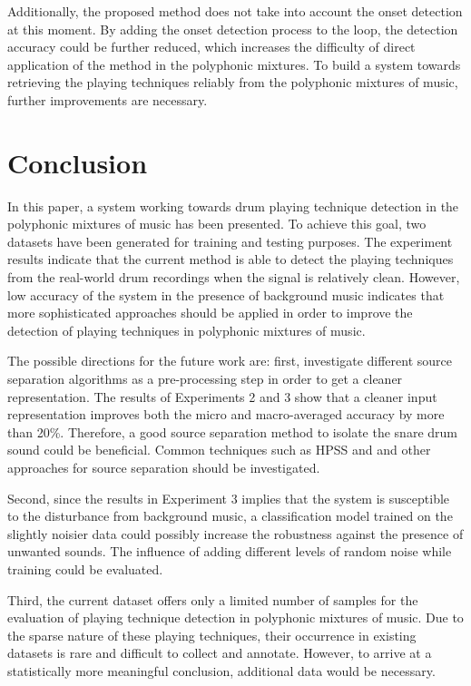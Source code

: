 \documentclass{article}
\begin{document}
{\color{red}{I am not sure about this. The location is definitely weird. Leave it out?}}Additionally, the proposed method does not take into account the onset detection at this moment. By adding the onset detection process to the loop, the detection accuracy could be further reduced, which increases the difficulty of direct application of the method in the polyphonic mixtures. {\color{red}{The following sentence is conclusion, not discussion}}To build a system towards retrieving the playing techniques reliably from the polyphonic mixtures of music, further improvements are necessary.  

\section{Conclusion}
\label{sec:conclusion}
In this paper, a system working towards drum playing technique detection in the polyphonic mixtures of music has been presented. To achieve this goal, two datasets have been generated for training and testing purposes. The experiment results indicate that the current method is able to detect the playing techniques from the real-world drum recordings when the signal is relatively clean. However, low accuracy of the system in the presence of background music indicates that more sophisticated approaches should be applied in order to improve the detection of playing techniques in polyphonic mixtures of music. 

The possible directions for the future work are: first, investigate different source separation algorithms as a pre-processing step in order to get a cleaner representation. The results of Experiments 2 and 3 show that a cleaner input representation improves both the micro and macro-averaged accuracy by more than 20\%. Therefore, a good source separation method to isolate the snare drum sound could be beneficial. Common techniques such as HPSS and and other approaches for source separation should be investigated.

Second, since the results in Experiment 3 implies that the system is susceptible to the disturbance from background music, a classification model trained on the slightly noisier data could possibly increase the robustness against the presence of unwanted sounds. The influence of adding different levels of random noise while training could be evaluated.

Third, the current dataset offers only a limited number of samples for the evaluation of playing technique detection in polyphonic mixtures of music. Due to the sparse nature of these playing techniques, their occurrence in existing datasets is rare and difficult to collect and annotate. However, to arrive at a statistically more meaningful conclusion, additional  data would be necessary.
\end{document}
